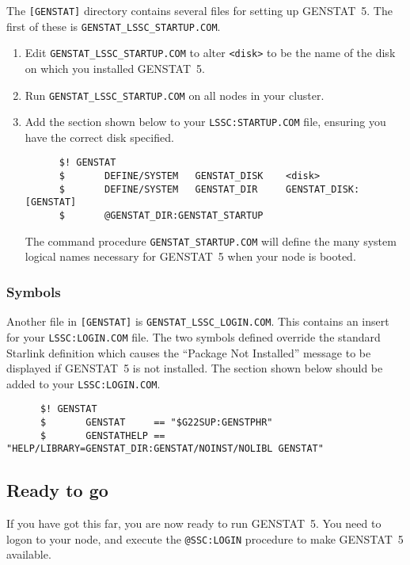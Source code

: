 The {\tt [GENSTAT]} directory contains several files for setting up GENSTAT~5.
The first of these is {\tt GENSTAT\_LSSC\_STARTUP.COM}. 
\begin{enumerate}
\item Edit {\tt GENSTAT\_LSSC\_STARTUP.COM} to alter \verb+<disk>+ to
be the name of the disk on which you installed GENSTAT~5.
\item Run {\tt GENSTAT\_LSSC\_STARTUP.COM} on all nodes in your cluster.
\item Add the section shown below to your {\tt LSSC:STARTUP.COM} file, ensuring
you have the correct disk specified. 
\begin{small}
\begin{verbatim}
      $! GENSTAT
      $       DEFINE/SYSTEM   GENSTAT_DISK    <disk>
      $       DEFINE/SYSTEM   GENSTAT_DIR     GENSTAT_DISK:[GENSTAT]
      $       @GENSTAT_DIR:GENSTAT_STARTUP
\end{verbatim}
\end{small}
The command procedure {\tt GENSTAT\_STARTUP.COM} will define the many system
logical names necessary for GENSTAT~5 when your node is booted.
\end{enumerate}

\subsubsection{Symbols}

Another file in {\tt [GENSTAT]} is {\tt GENSTAT\_LSSC\_LOGIN.COM}. This 
contains an insert for your {\tt LSSC:LOGIN.COM} file. The two symbols defined 
override the standard Starlink definition which causes the ``Package Not
Installed'' message to be displayed if GENSTAT~5 is not installed.  The section
shown below should be added to your {\tt LSSC:LOGIN.COM}.
\begin{small}
\begin{verbatim}
      $! GENSTAT
      $       GENSTAT     == "$G22SUP:GENSTPHR"
      $       GENSTATHELP == "HELP/LIBRARY=GENSTAT_DIR:GENSTAT/NOINST/NOLIBL GENSTAT"
\end{verbatim}
\end{small}

\subsection{Ready to go}

If you have got this far, you are now ready to run GENSTAT~5. You need to logon
to your node, and execute the {\tt @SSC:LOGIN} procedure to make GENSTAT~5
available. 

